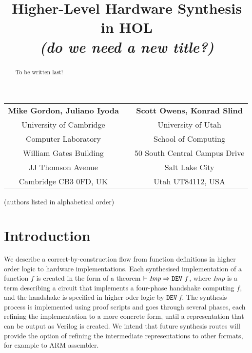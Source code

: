 \documentclass{llncs}
\title{Higher-Level Hardware Synthesis in HOL\\
{\it (do we need a new title?)}\\[-4mm]}
\author{}
\institute{}
\begin{document}
\maketitle

\vspace*{-8mm}

\begin{center}
\begin{tabular}{ccc}
{\bf Mike Gordon, Juliano Iyoda} &\hspace*{5mm}& {\bf Scott Owens, Konrad Slind}\\
University of Cambridge          &\hspace*{5mm}& University of Utah\\
Computer Laboratory              &\hspace*{5mm}& School of Computing\\
William Gates Building           &\hspace*{5mm}& 50 South Central Campus Drive\\
JJ Thomson Avenue                &\hspace*{5mm}& Salt Lake City\\
Cambridge CB3 0FD, UK            &\hspace*{5mm}& Utah UT84112, USA
\end{tabular}


\vspace*{2mm}

(authors listed in alphabetical order)
\end{center}

\vspace*{-5mm}

\thispagestyle{empty}

\begin{abstract}
To be written last!
\end{abstract}

\section{Introduction}
\label{secIntroduction}

We describe a correct-by-construction flow from function definitions
in higher order logic to hardware implementations.  Each synthesised
implementation of a function $f$ is created in the form of a theorem
$\vdash {\it{Imp}}\Rightarrow\texttt{DEV}~f$, where {\it{Imp}} is a
term describing a circuit that implements a four-phase handshake
computing $f$, and the handshake is specified in higher oder logic by
$\texttt{DEV}~f$. The synthesis process is implemented using proof
scripts and goes through several phases, each refining the
implementation to a more concrete form, until a representation that
can be output as Verilog is created. We intend that future synthesis
routes will provide the option of refining the intermediate
representations to other formats, for example to ARM
assembler.
\end{document}
